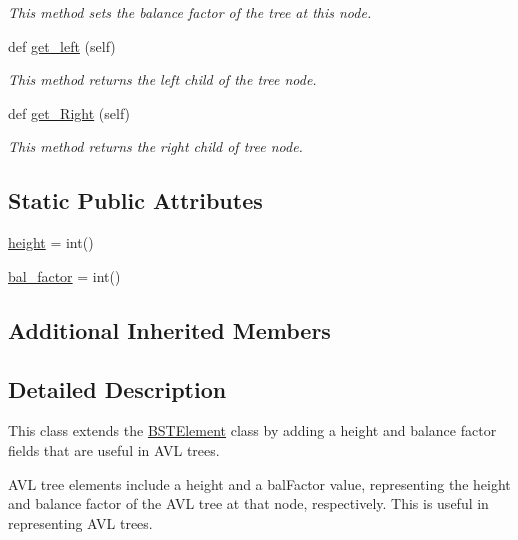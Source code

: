 \begin{DoxyCompactItemize}
\begin{DoxyCompactList}\small\item\em This method sets the balance factor of the tree at this node. \end{DoxyCompactList}\item 
def \mbox{\hyperlink{class_bridges_1_1_a_v_l_tree_element_1_1_a_v_l_tree_element_a71d96415ebf9ac178130e7eea992a37f}{get\+\_\+left}} (self)
\begin{DoxyCompactList}\small\item\em This method returns the left child of the tree node. \end{DoxyCompactList}\item 
def \mbox{\hyperlink{class_bridges_1_1_a_v_l_tree_element_1_1_a_v_l_tree_element_ad4b8e91aac85054b9df40b3868a4f0f4}{get\+\_\+\+Right}} (self)
\begin{DoxyCompactList}\small\item\em This method returns the right child of tree node. \end{DoxyCompactList}\end{DoxyCompactItemize}
\subsection*{Static Public Attributes}
\begin{DoxyCompactItemize}
\item 
\mbox{\hyperlink{class_bridges_1_1_a_v_l_tree_element_1_1_a_v_l_tree_element_af8856cd0f69c2299f293fe5c4891651f}{height}} = int()
\item 
\mbox{\hyperlink{class_bridges_1_1_a_v_l_tree_element_1_1_a_v_l_tree_element_a177be99460415a9fc520927c7d02ab65}{bal\+\_\+factor}} = int()
\end{DoxyCompactItemize}
\subsection*{Additional Inherited Members}


\subsection{Detailed Description}
This class extends the \mbox{\hyperlink{namespace_bridges_1_1_b_s_t_element}{B\+S\+T\+Element}} class by adding a height and balance factor fields that are useful in A\+VL trees. 

A\+VL tree elements include a \textquotesingle{}height\textquotesingle{} and a \textquotesingle{}bal\+Factor\textquotesingle{} value, representing the height and balance factor of the A\+VL tree at that node, respectively. This is useful in representing A\+VL trees.

